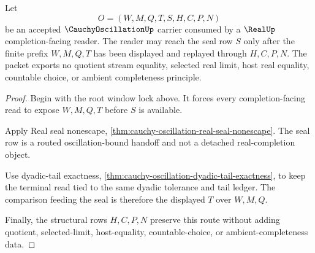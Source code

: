 \begin{theorem}
\label{thm:cauchy-oscillation-real-completion-consumer}
Let
$$
O=(W,M,Q,T,S,H,C,P,N)
$$
be an accepted $\CauchyOscillationUp$ carrier consumed by a $\RealUp$ completion-facing reader. The reader may reach the seal row $S$ only after the finite prefix $W,M,Q,T$ has been displayed and replayed through $H,C,P,N$. The packet exports no quotient stream equality, selected real limit, host real equality, countable choice, or ambient completeness principle.
\end{theorem}
\begin{proof}
Begin with the root window lock above. It forces every completion-facing read to expose $W,M,Q,T$ before $S$ is available.

Apply Real seal nonescape, \autoref{thm:cauchy-oscillation-real-seal-nonescape}. The seal row is a routed oscillation-bound handoff and not a detached real-completion object.

Use dyadic-tail exactness, \autoref{thm:cauchy-oscillation-dyadic-tail-exactness}, to keep the terminal read tied to the same dyadic tolerance and tail ledger. The comparison feeding the seal is therefore the displayed $T$ over $W,M,Q$.

Finally, the structural rows $H,C,P,N$ preserve this route without adding quotient, selected-limit, host-equality, countable-choice, or ambient-completeness data.
\end{proof}

